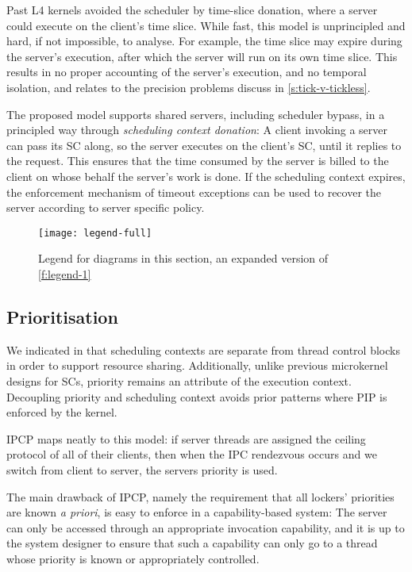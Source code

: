 Past L4 kernels avoided the scheduler by time-slice donation, where a
server could execute on the client's time slice. While fast, this
model is unprincipled and hard, if not impossible, to
analyse. For example, the time slice may expire during the server's
execution, after which the server will run on its own time slice.
This results in no proper accounting of the server's execution, and no temporal isolation, and
relates to the precision problems discuss in \cref{s:tick-v-tickless}.

The proposed model supports shared servers, including scheduler
bypass, in a principled way through \emph{scheduling context
donation}: A client invoking a server can pass its SC along, so the
server executes on the client's SC, until it replies to the
request. This ensures that the time consumed by the server is billed
to the client on whose behalf the server's work is done. If the scheduling context 
expires, the enforcement mechanism of timeout exceptions can be used to recover the server according 
to server specific policy.

\begin{figure}
    \centering
    \texttt{[image: legend-full]}
    \caption{Legend for diagrams in this section, an expanded version of \cref{f:legend-1}}
    \label{f:legend-2}
\end{figure}

\subsection{Prioritisation}

We indicated in  that scheduling contexts are separate from thread control blocks in
order to support resource sharing. Additionally, unlike previous microkernel designs for \glspl{SC}, priority
remains an attribute of the execution context. Decoupling priority and scheduling context avoids
prior patterns where \gls{PIP} is enforced by the kernel. 

\gls{IPCP} maps neatly to this model: if server threads are assigned the ceiling protocol of all of
their clients, then when the \gls{IPC} rendezvous occurs and we switch from client to server, the
servers priority is used.

The main drawback of \gls{IPCP}, namely the requirement that all
lockers' priorities are known \emph{a priori}, is easy to enforce in a
capability-based system: The server can only be accessed through an
appropriate invocation capability, and it is up to the system designer
to ensure that such a capability can only go to a thread whose
priority is known or appropriately controlled.

